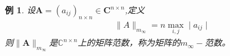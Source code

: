 \documentclass{sintefbeamer}[dark]
\newtheorem*{例}{例}
\begin{document}
\begin{frame}
	\begin{例}
		设$\mathbf{A}=\left(a_{ij}\right)_{n\times n}\in\mathbf{C}^{n\times n}$,定义
		\begin{equation*}
			\begin{aligned}
				&\parallel A\parallel_{m_\infty}=n\max_{i,j}\mid a_{ij}\mid 
			\end{aligned}
		\end{equation*}
		则$\parallel\mathbf{A}\parallel_{m_\infty}$是$\mathbb{C}^{n\times n}$上的矩阵范数，称为矩阵的$m_{\infty}-$范数。
	\end{例}
\end{frame}

\backmatter
\end{document}
